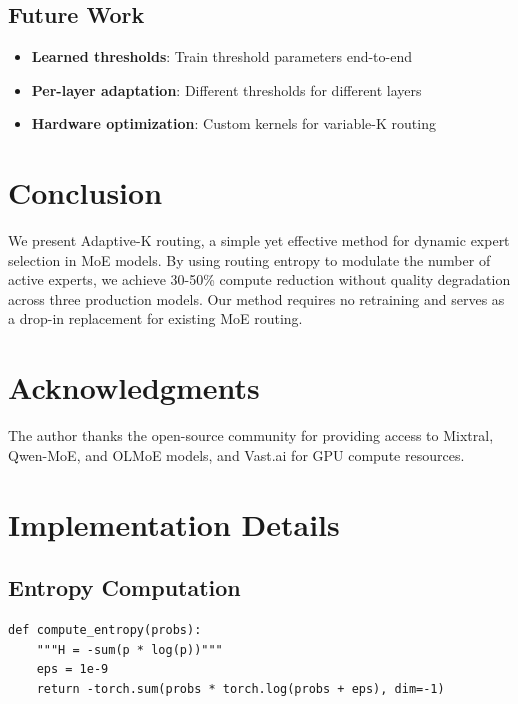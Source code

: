 \documentclass{article}
\begin{document}
\subsection{Future Work}

\begin{itemize}
    \item \textbf{Learned thresholds}: Train threshold parameters end-to-end
    \item \textbf{Per-layer adaptation}: Different thresholds for different layers
    \item \textbf{Hardware optimization}: Custom kernels for variable-K routing
\end{itemize}

\section{Conclusion}

We present Adaptive-K routing, a simple yet effective method for dynamic expert selection in MoE models. By using routing entropy to modulate the number of active experts, we achieve 30-50\% compute reduction without quality degradation across three production models. Our method requires no retraining and serves as a drop-in replacement for existing MoE routing.

\section*{Acknowledgments}

The author thanks the open-source community for providing access to Mixtral, Qwen-MoE, and OLMoE models, and Vast.ai for GPU compute resources.




\appendix

\section{Implementation Details}

\subsection{Entropy Computation}

\begin{lstlisting}
def compute_entropy(probs):
    """H = -sum(p * log(p))"""
    eps = 1e-9
    return -torch.sum(probs * torch.log(probs + eps), dim=-1)
\end{lstlisting}
\end{document}
